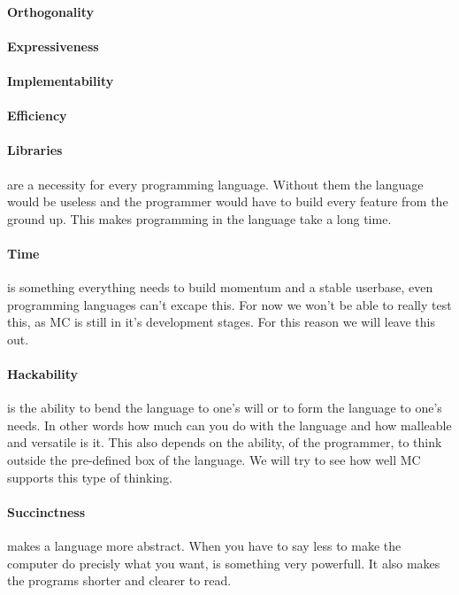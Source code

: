 \begin{multicols}{2}
\paragraph{Orthogonality}


\paragraph{Expressiveness}

\paragraph{Implementability}

\paragraph{Efficiency}

\paragraph{Libraries}
are a necessity for every programming language. Without them the language would be useless and the programmer would have to build every feature from the ground up. This makes programming in the language take a long time.

\paragraph{Time}
is something everything needs to build momentum and a stable userbase, even programming languages can't excape this. For now we won't be able to really test this, as MC is still in it's development stages. For this reason we will leave this out.

\paragraph{Hackability}
is the ability to bend the language to one's will or to form the language to one's needs. In other words how much can you do with the language and how malleable and versatile is it. This also depends on the ability, of the programmer, to think outside the pre-defined box of the language. We will try to see how well MC supports this type of thinking.

\paragraph{Succinctness}
makes a language more abstract. When you have to say less to make the computer do precisly what you want, is something very powerfull. It also makes the programs shorter and clearer to read.


\end{multicols}

